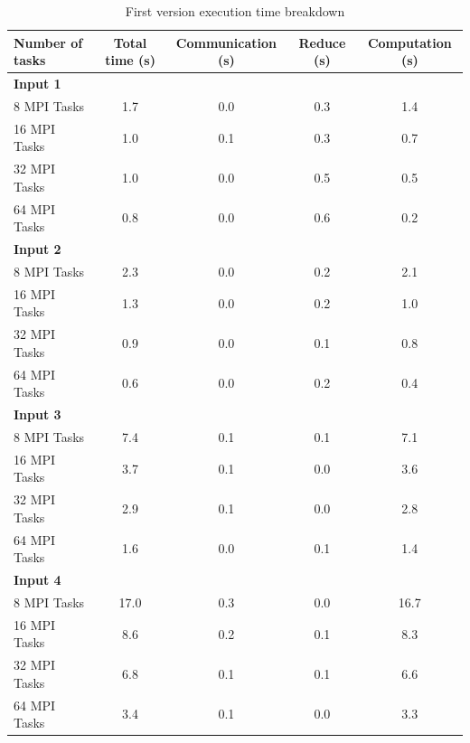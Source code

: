\documentclass{article}
\begin{document}
\begin{table}[htbp]
  \centering
  \label{tab:mpi_performance}
  \begin{tabular}{lcccc}
    \toprule
    \textbf{Number of tasks} & \textbf{Total time (s)} & \textbf{Communication (s)} & \textbf{Reduce (s)} & \textbf{Computation (s)} \\
    \midrule
    \textbf{Input 1} & & & & \\
    8 MPI Tasks & 1.7 & 0.0 & 0.3 & 1.4 \\
    16 MPI Tasks & 1.0 & 0.1 & 0.3 & 0.7 \\
    32 MPI Tasks & 1.0 & 0.0 & 0.5 & 0.5 \\
    64 MPI Tasks & 0.8 & 0.0 & 0.6 & 0.2 \\
    \midrule
    \textbf{Input 2} & & & & \\
    8 MPI Tasks & 2.3 & 0.0 & 0.2 & 2.1 \\
    16 MPI Tasks & 1.3 & 0.0 & 0.2 & 1.0 \\
    32 MPI Tasks & 0.9 & 0.0 & 0.1 & 0.8 \\
    64 MPI Tasks & 0.6 & 0.0 & 0.2 & 0.4 \\
    \midrule
    \textbf{Input 3} & & & & \\
    8 MPI Tasks & 7.4 & 0.1 & 0.1 & 7.1 \\
    16 MPI Tasks & 3.7 & 0.1 & 0.0 & 3.6 \\
    32 MPI Tasks & 2.9 & 0.1 & 0.0 & 2.8 \\
    64 MPI Tasks & 1.6 & 0.0 & 0.1 & 1.4 \\
    \midrule
    \textbf{Input 4} & & & & \\
    8 MPI Tasks & 17.0 & 0.3 & 0.0 & 16.7 \\
    16 MPI Tasks & 8.6 & 0.2 & 0.1 & 8.3 \\
    32 MPI Tasks & 6.8 & 0.1 & 0.1 & 6.6 \\
    64 MPI Tasks & 3.4 & 0.1 & 0.0 & 3.3 \\
    \bottomrule
  \end{tabular}
  \caption{First version execution time breakdown}
\end{table}
\end{document}

